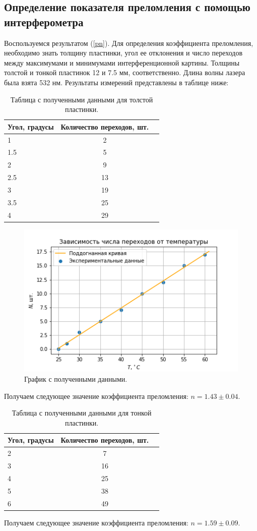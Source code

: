 \documentclass[a4paper, 12pt]{article}
\begin{document}
	 \subsection*{Определение показателя преломления с помощью интерферометра}
	 Воспользуемся результатом (\ref{pn}). Для определения коэффициента преломления, необходимо знать толщину пластинки, угол ее отклонения и число переходов между максимумами и минимумами интерференционной картины. Толщины толстой и тонкой пластинок 12 и 7.5 мм, соответственно. Длина волны лазера была взята 532 нм. Результаты измерений представлены в таблице ниже:
	\begin{table}[H]
		\centering
		\caption{Таблица с полученными данными для толстой пластинки.}
		\begin{tabular}[t]{lcc}
			\hline
			Угол, градусы&Количество переходов, шт.\\
			\hline
			1&2\\
			1.5&5\\
			2&9\\
			2.5&13\\
			3&19\\
			3.5&25\\
			4&29\\
			\hline
		\end{tabular}
	\end{table}
	\begin{figure}[H]
		\centering
		\includegraphics[width=0.85\linewidth]{maic2.png}
		\caption{График с полученными данными.}
		\label{fig:5}
	\end{figure}
	Получаем следующее значение коэффициента преломления:  $n = 1.43 \pm 0.04$.
	\begin{table}[H]
		\centering
		\caption{Таблица с полученными данными для тонкой пластинки.}
		\begin{tabular}[t]{lcc}
			\hline
			Угол, градусы&Количество переходов, шт.\\
			\hline
			2&7\\
			3&16\\
			4&25\\
			5&38\\
			6&49\\
			\hline
		\end{tabular}
	\end{table}
	Получаем следующее значение коэффициента преломления: $n = 1.59 \pm 0.09$.
\end{document}
